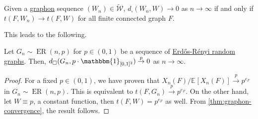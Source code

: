 \begin{theorem}\label{thm:graphon-convergence}
	Given a \hyperref[def:graphon]{graphon} sequence \((W_n) \in \widetilde{\mathcal{W}} \), \(d_{\square}(W_n, W) \to 0\) as \(n \to \infty \) if and only if \(t(F, W_n) \to t(F, W)\) for all finite connected graph \(F\).
\end{theorem}

This leads to the following.

\begin{corollary}\label{col:Erdős-Rényi-random-graphs-converge-to-constant-graphon}
	Let \(G_n \sim \operatorname{ER}(n, p) \) for \(p \in (0, 1)\) be a sequence of \hyperref[def:Erdős-Rényi-random-graph]{Erdős-Rényi random graphs}. Then, \(d_{\square} (G_n, p \cdot \mathbbm{1}_{[0, 1]^2} ) \overset{p}{\to} 0\) as \(n \to \infty \).
\end{corollary}
\begin{proof}
	For a fixed \(p \in (0, 1)\), we have proven that \(X_n(F) / \mathbb{E}_{}[X_n(F)] \overset{p}{\to} p^{e_F}\) in \(G_n \sim \operatorname{ER}(n, p) \). This is equivalent to \(t(F, G_n) \overset{p}{\to} p^{e_F}\). On the other hand, let \(W \equiv p\), a constant function, then \(t(F, W) = p^{e_F}\) as well. From \autoref{thm:graphon-convergence}, the result follows.
\end{proof}